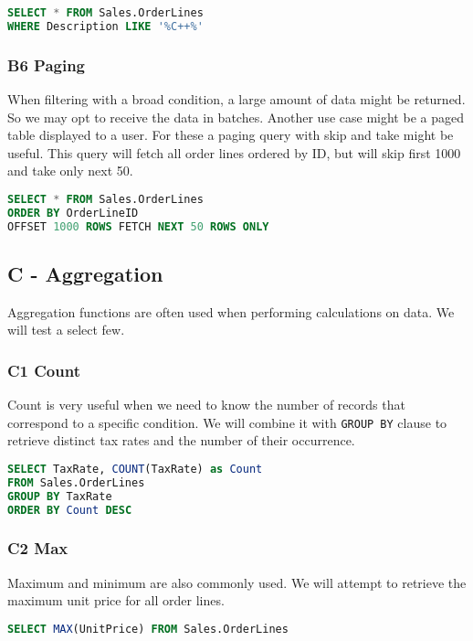 \begin{lstlisting}[language=SQL]
SELECT * FROM Sales.OrderLines 
WHERE Description LIKE '%C++%'
\end{lstlisting}

\subsubsection*{B6 Paging}
When filtering with a broad condition, a large amount of data might be returned. So we may opt to receive the data in batches. Another use case might be a paged table displayed to a user. For these a paging query with skip and take might be useful.
This query will fetch all order lines ordered by ID, but will skip first 1000 and take only next 50.

\begin{lstlisting}[language=SQL]
SELECT * FROM Sales.OrderLines 
ORDER BY OrderLineID 
OFFSET 1000 ROWS FETCH NEXT 50 ROWS ONLY
\end{lstlisting}

\subsection{C - Aggregation}
Aggregation functions are often used when performing calculations on data. We will test a select few.

\subsubsection*{C1 Count}
Count is very useful when we need to know the number of records that correspond to a specific condition. We will combine it with \texttt{GROUP BY} clause to retrieve distinct tax rates and the number of their occurrence.

\begin{lstlisting}[language=SQL]
SELECT TaxRate, COUNT(TaxRate) as Count 
FROM Sales.OrderLines 
GROUP BY TaxRate 
ORDER BY Count DESC
\end{lstlisting}

\subsubsection*{C2 Max}
Maximum and minimum are also commonly used. We will attempt to retrieve the maximum unit price for all order lines.

\begin{lstlisting}[language=SQL]
SELECT MAX(UnitPrice) FROM Sales.OrderLines
\end{lstlisting}

